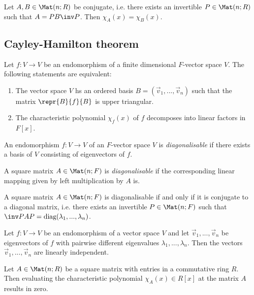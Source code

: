 \documentclass{article}
\begin{document}
\begin{lemma}
	Let $A,B\in\Mat(n; R)$ be conjugate, i.e. there exists an invertible $P\in\Mat(n; R)$ such that
	$A=PB\inv P$. Then $\chi_A(x)=\chi_B(x)$.
\end{lemma}

\subsection{Cayley-Hamilton theorem}

\begin{proposition}
	Let $f:V\to V$ be an endomorphism of a finite dimensional $F$-vector space $V$. The following
	statements are equivalent:
	\begin{enumerate}
		\item The vector space $V$ hs an ordered basis $B=(\vec v_1,...,\vec v_n)$ such that the matrix
		      $\repr{B}{f}{B}$ is upper triangular.
		\item The characteristic polynomial $\chi_f(x)$ of $f$ decomposes into linear factors in $F[x]$.
	\end{enumerate}
\end{proposition}

\begin{definition}
	An endomorphism $f:V\to V$ of an $F$-vector space $V$ is \emph{diagonalisable} if there exists
	a basis of $V$ consisting of eigenvectors of $f$.

	A square matrix $A\in\Mat(n;F)$ is \emph{diagonalisable} if the corresponding linear mapping
	given by left multiplication by $A$ is.
\end{definition}

\begin{theorem}
	A square matrix $A\in\Mat(n;F)$ is diagonalisable if and only if it is conjugate to a diagonal
	matrix, i.e. there exists an invertible $P\in\Mat(n;F)$ such that
	$\inv PAP=\text{diag}(\lambda_1,...,\lambda_n)$.
\end{theorem}

\begin{lemma}[Notes 4.6.9]
	Let $f:V\to V$ be an endomorphism of a vector space $V$ and let $\vec v_1,...,\vec v_n$ be
	eigenvectors of $f$ with pairwise different eigenvalues $\lambda_1,...,\lambda_n$. Then
	the vectors $\vec v_1,...,\vec v_n$ are linearly independent.
\end{lemma}

\begin{theorem}
	Let $A\in\Mat(n;R)$ be a square matrix with entries in a commutative ring $R$. Then evaluating the
	characteristic polynomial $\chi_A(x)\in R[x]$ at the matrix $A$ results in zero.
\end{theorem}
\end{document}
